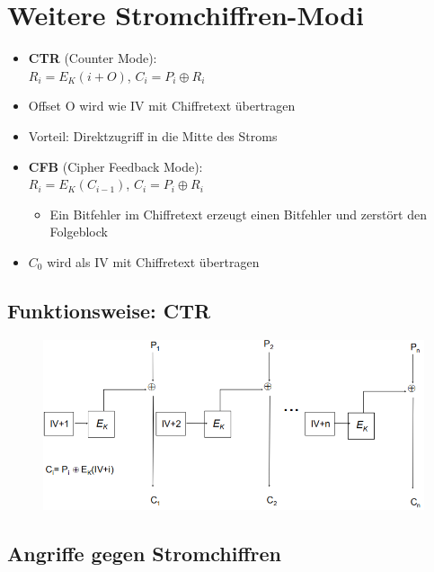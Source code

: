 \documentclass[openany]{book}
\begin{document}
\section{Weitere Stromchiffren-Modi}

\begin{itemize}
    \item \textbf{CTR} (Counter Mode): \\ $R_i = E_K(i+O)$, $C_i=P_i\oplus R_i$
    \item Offset O wird wie IV mit Chiffretext übertragen
    \item Vorteil: Direktzugriff in die Mitte des Stroms \\
    \item \textbf{CFB} (Cipher Feedback Mode): \\ $R_i = E_K(C_{i-1})$, $C_i = P_i\oplus R_i$
    \begin{itemize}
        \item Ein Bitfehler im Chiffretext erzeugt einen Bitfehler und zerstört den Folgeblock
    \end{itemize}
    \item $C_0$ wird als IV mit Chiffretext übertragen
\end{itemize}

\subsection{Funktionsweise: CTR}

\begin{figure}[h!]
    \centering
    \includegraphics[width=0.85\linewidth]{Pics/CTR.PNG}
\end{figure} 

\subsection{Angriffe gegen Stromchiffren}
\end{document}
